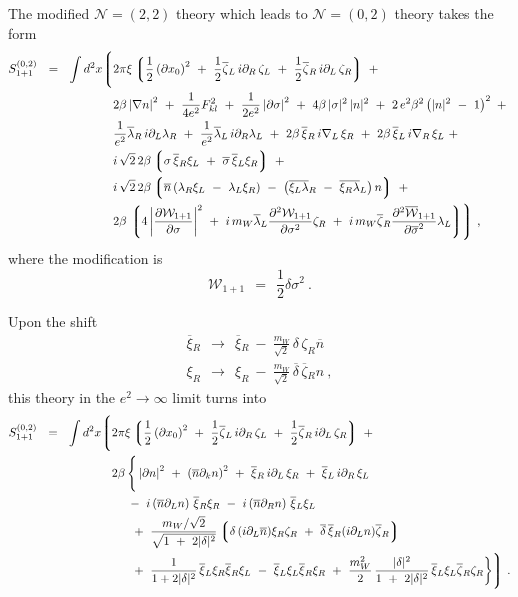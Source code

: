 \documentclass{article}
\newcommand{\p}{\partial}
\newcommand{\ov}{\overline}
\newcommand{\mc}[1]{\mathcal{#1}}
\newcommand{\lgr}{\left\lgroup}
\newcommand{\rgr}{\right\rgroup}
\newcommand{\bxir}{\ov{\xi}{}_R}
\newcommand{\bxil}{\ov{\xi}{}_L}
\newcommand{\xir}{\xi_R}
\newcommand{\xil}{\xi_L}
\newcommand{\bzl}{\ov{\zeta}{}_L}
\newcommand{\bzr}{\ov{\zeta}{}_R}
\newcommand{\zr}{\zeta_R}
\newcommand{\zl}{\zeta_L}
\begin{document}
The modified $ \mc{N} = (2,2) $ theory which leads to $ \mc{N}=(0,2) $ theory takes the form
\begin{align*}
%
	S_{1+1}^{(0,2)}  ~~=~~ \int d^2 x 
\Biggl \lgroup
&
	2\pi\xi \lgr \frac 1 2 \left (\p x_0\right)^2 ~+~
		      \frac 1 2 \ov{\zeta}{}_L\, i\p_R\, \zeta_L ~+~
			\frac 1 2 \ov {\zeta}{}_R\, i\p_L\, \zeta_R
		\rgr
	~+~ \\
%
&
	2\beta \left| \nabla n \right|^2 ~+~ \frac{1}{4e^2} F_{kl}^2
			~+~ \frac{1}{2e^2} \left|\p \sigma\right|^2 ~+~
	4\beta\, |\sigma|^2\, |n|^2 ~+~
	2\, e^2\beta^2 \left( |n|^2 ~-~ 1 \right)^2 ~+~\\
%
&
	\frac{1}{e^2} \ov{\lambda}{}_R\, i\p_L \lambda_R ~+~
	\frac{1}{e^2} \ov{\lambda}{}_L\, i\p_R \lambda_L ~+~
	2\beta\, \ov{\xi}{}_R\, i\nabla_L\, \xi_R ~+~
	2\beta\, \ov{\xi}{}_L\, i\nabla_R\, \xi_L ~+~ \\
%
&
	i\,\sqrt{2}\,2\beta \lgr \sigma\, \ov{\xi}{}_R\xi_L ~+~ 
				\ov{\sigma}\,\ov{\xi}{}_L\xi_R \rgr ~+~ \\
%
&
	i\,\sqrt{2}\,2\beta 
		\lgr \ov{n} \left( \lambda_R \xi_L ~-~ \lambda_L\xi_R \right)
		~-~ \left( \ov{\xi_L\lambda}{}_R ~-~ \ov{\xi_R\lambda}{}_L \right) n \rgr 
	~+~\\
%
&	
	2\beta\,
	\lgr 4 \left | \frac{\p \mc{W}_{1+1}}{\p\sigma} \right |^2 
		~+~ i\, m_W \ov{\lambda}_L \frac{\p^2 \mc{W}_{1+1}}{\p \sigma^2} \zeta_R 
	~+~ i\, m_W \ov{\zeta}{}_R \frac{\p^2 \ov{\mc{W}}{}_{1+1}}{\p\ov{\sigma}^2} \lambda_L 
	\rgr
	\Biggr \rgroup~,
\end{align*}
	where the modification is
\[
	\mc{W}_{1+1} ~~=~~ \frac 1 2 \delta \sigma^2~.
\]


	Upon the shift 
\begin{align*}
%
	\bxir ~~\to~~ \bxir ~-~ \frac{m_W}{\sqrt{2}}\, \delta\,\zeta_R\ov{n} \\
%
	\xi_R ~~\to~~ \xi_R ~-~ \frac{m_W}{\sqrt{2}}\, \ov{\delta}\, \bzr n~,
\end{align*}
	this theory in the $ e^2 \to \infty $ limit turns into
\begin{align}
%
\notag
S_{1+1}^{(0,2)} ~~=~~
	\int d^2 x 
\Biggl\lgroup
&
	2\pi\xi \lgr \frac 1 2 \left (\p x_0\right)^2 ~+~
		      \frac 1 2 \bzl\, i\p_R\, \zl ~+~
			\frac 1 2 \bzr\, i\p_L\, \zr
		\rgr
	~+~ \\
%
\label{world02_unnorm}
&
	2\beta\, \Bigg\{
	\left|\p n\right|^2 ~+~ \left(\ov{n}\p_k n\right)^2 ~+~
	\bxir \, i\p_L \, \xir  ~+~ \bxil \, i\p_R \, \xil \\
%
\notag
&
	~~~~
	-~
	i \left(\ov{n}\p_L n\right)\, \bxir \xir ~-~ 
	i \left(\ov{n}\p_R n\right)\, \bxil \xil 
	\\
%
\notag
&
	~~~~
	~+~
	\frac{m_W/\sqrt{2}} { \sqrt{ 1~+~2|\delta|^2 } }
	\lgr \delta\, (i\p_L \ov{n}) \xir\zr ~+~ 
             \ov{\delta}\, \bxir (i\p_L n)\bzr 
	\rgr \\
%
\notag
&
	~~~~
	~+~ \frac{1}{1 + 2|\delta|^2}\, \bxil\xir \bxir\xil 
	~-~ \bxil\xil\bxir\xir
	~+~
	\frac{m_W^2}{2}\,\frac{|\delta|^2}{1 ~+~ 2|\delta|^2}\,
		\bxil\xil\bzr\zr \bigg\} 
\Biggr\rgroup~.
\end{align}
\end{document}
